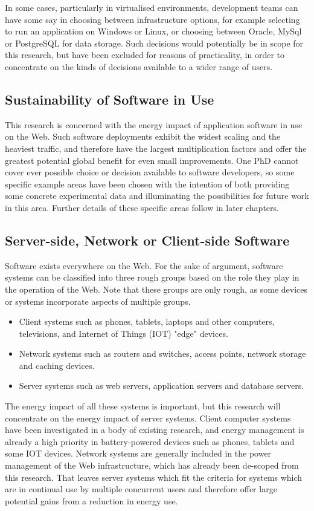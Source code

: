 In some cases, particularly in virtualised environments, development teams can have some say in choosing between infrastructure options, for example selecting to run an application on Windows or Linux, or choosing between Oracle, MySql or PostgreSQL for data storage. Such decisions would potentially be in scope for this research, but have been excluded for reasons of practicality, in order to concentrate on the kinds of decisions available to a wider range of users.

\subsection{Sustainability of Software in Use}

This research is concerned with the energy impact of application software in use on the Web. Such software deployments exhibit the widest scaling and the heaviest traffic, and therefore have the largest multiplication factors and offer the greatest potential global benefit for even small improvements. One PhD cannot cover ever possible choice or decision available to software developers, so some specific example areas have been chosen with the intention of both providing some concrete experimental data and illuminating the possibilities for future work in this area. Further details of these specific areas follow in later chapters.

\subsection{Server-side, Network or Client-side Software}

Software exists everywhere on the Web. For the sake of argument, software systems can be classified into three rough groups based on the role they play in the operation of the Web. Note that these groups are only rough, as some devices or systems incorporate aspects of multiple groups.
\begin{itemize}
    \item Client systems such as phones, tablets, laptops and other computers, televisions, and Internet of Things (IOT) "edge" devices.
    \item Network systems such as routers and switches, access points, network storage and caching devices.
    \item Server systems such as web servers, application servers and database servers.
\end{itemize}

The energy impact of all these systems is important, but this research will concentrate on the energy impact of server systems. Client computer systems have been investigated in a body of existing research, and energy management is already a high priority in battery-powered devices such as phones, tablets and some IOT devices. Network systems are generally included in the power management of the Web infrastructure, which has already been de-scoped from this research. That leaves server systems which fit the criteria for systems which are in continual use by multiple concurrent users and therefore offer large potential gains from a reduction in energy use.

